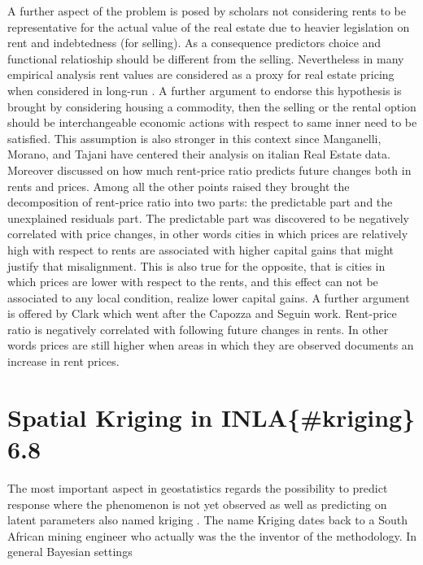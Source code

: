 \documentclass[
  12pt,
  a4paper,
  oneside]{book}
\theoremstyle{definition}
\theoremstyle{definition}
\theoremstyle{definition}
\theoremstyle{remark}
\begin{document}
A further aspect of the problem is posed by scholars not considering rents to be representative for the actual value of the real estate due to heavier legislation on rent and indebtedness (for selling). As a consequence predictors choice and functional relatioship should be different from the selling. Nevertheless in many empirical analysis rent values are considered as a proxy for real estate pricing when considered in long-run \citep{Herath_Maier_2011}. A further argument to endorse this hypothesis is brought by \citet{sellingVSrental} considering housing a commodity, then the selling or the rental option should be interchangeable economic actions with respect to same inner need to be satisfied. This assumption is also stronger in this context since Manganelli, Morano, and Tajani have centered their analysis on italian Real Estate data. Moreover \citet{Capozza_Seguin_1996} discussed on how much rent-price ratio predicts future changes both in rents and prices. Among all the other points raised they brought the decomposition of rent-price ratio into two parts: the predictable part and the unexplained residuals part. The predictable part was discovered to be negatively correlated with price changes, in other words cities in which prices are relatively high with respect to rents are associated with higher capital gains that might justify that misalignment. This is also true for the opposite, that is cities in which prices are lower with respect to the rents, and this effect can not be associated to any local condition, realize lower capital gains. A further argument is offered by Clark \citep{Clark_1995} which went after the Capozza and Seguin work. Rent-price ratio is negatively correlated with following future changes in rents. In other words prices are still higher when areas in which they are observed documents an increase in rent prices.

\hypertarget{spatial-kriging-in-inlakriging-6.8}{%
\section{Spatial Kriging in INLA\{\#kriging\} 6.8}\label{spatial-kriging-in-inlakriging-6.8}}

The most important aspect in geostatistics regards the possibility to predict response where the phenomenon is not yet observed as well as predicting on latent parameters also named kriging \citep{gelfand2010handbook}. The name Kriging dates back to a South African mining engineer who actually was the the inventor of the methodology. In general Bayesian settings
\end{document}
